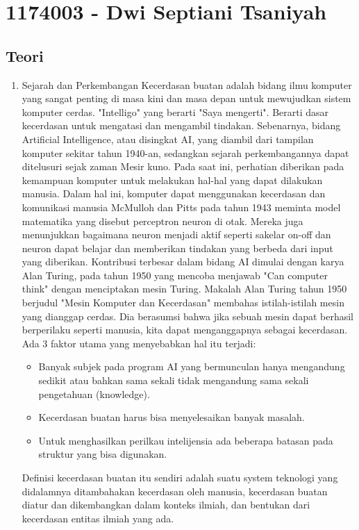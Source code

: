 \section{1174003 - Dwi Septiani Tsaniyah}
\subsection{Teori}
\begin{enumerate}
	\item Sejarah dan Perkembangan
	\hfill\break
	Kecerdasan buatan adalah bidang ilmu komputer yang sangat penting di masa kini dan masa depan untuk mewujudkan sistem komputer cerdas. "Intelligo" yang berarti "Saya mengerti". Berarti dasar kecerdasan untuk mengatasi dan mengambil tindakan. Sebenarnya, bidang Artificial Intelligence, atau disingkat AI, yang diambil dari tampilan komputer sekitar tahun 1940-an, sedangkan sejarah perkembangannya dapat ditelusuri sejak zaman Mesir kuno. Pada saat ini, perhatian diberikan pada kemampuan komputer untuk melakukan hal-hal yang dapat dilakukan manusia. Dalam hal ini, komputer dapat menggunakan kecerdasan dan komunikasi manusia McMulloh dan Pitts pada tahun 1943 meminta model matematika yang disebut perceptron neuron di otak. Mereka juga menunjukkan bagaimana neuron menjadi aktif seperti sakelar on-off dan neuron dapat belajar dan memberikan tindakan yang berbeda dari input yang diberikan. Kontribusi terbesar dalam bidang AI dimulai dengan karya Alan Turing, pada tahun 1950 yang mencoba menjawab "Can computer think" dengan menciptakan mesin Turing. Makalah Alan Turing tahun 1950 berjudul "Mesin Komputer dan Kecerdasan" membahas istilah-istilah mesin yang dianggap cerdas. Dia berasumsi bahwa jika sebuah mesin dapat berhasil berperilaku seperti manusia, kita dapat menganggapnya sebagai kecerdasan. Ada 3 faktor utama yang menyebabkan hal itu terjadi:
	\begin{itemize}
		\item Banyak subjek pada program AI yang bermunculan hanya mengandung sedikit atau bahkan sama sekali tidak  mengandung sama sekali pengetahuan (knowledge).
		\item Kecerdasan buatan harus bisa menyelesaikan banyak masalah.
		\item Untuk menghasilkan perilkau intelijensia ada beberapa batasan pada struktur yang bisa digunakan.
	\end{itemize}
	Definisi kecerdasan buatan itu sendiri adalah suatu system teknologi yang didalamnya ditambahakan kecerdasan oleh manusia, kecerdasan buatan diatur dan dikembangkan dalam konteks ilmiah, dan bentukan dari kecerdasan entitas ilmiah yang ada.

\end{enumerate}
